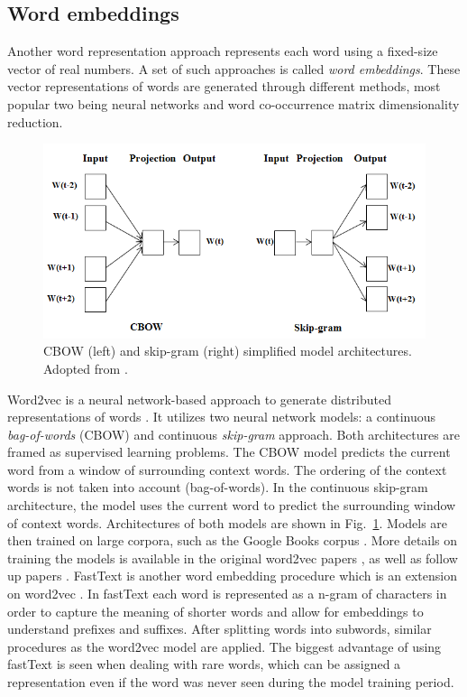 \subsection{Word embeddings}
\label{sec:embedding}

Another word representation approach represents each word using a fixed-size
vector of real numbers. A set of such approaches is called \textit{word
embeddings}. These vector representations of words are generated through
different methods, most popular two being neural networks and word co-occurrence
matrix dimensionality reduction.

\begin{figure}
	\includegraphics[scale=0.65]{skip_gram_cbow.png}
	\caption{CBOW (left) and skip-gram (right) simplified model architectures. Adopted from 
	\citep{suleiman2017deep}. }
	\label{fig:skip_gram_cbow}
\end{figure}

Word2vec is a neural network-based approach to generate distributed
representations of words \citep{mikolov2013distributed}.  It utilizes two
neural network models: a continuous \textit{bag-of-words} (CBOW) and continuous
\textit{skip-gram} approach.  Both architectures are framed as supervised learning problems.
The CBOW model predicts the current word from a window of
surrounding context words. 
The ordering of the context words is not taken into
account (bag-of-words). In the continuous skip-gram architecture, the model
uses the current word to predict the surrounding window of context words.
Architectures of both models are shown in Fig.~\ref{fig:skip_gram_cbow}. 
Models are then trained on large corpora, such as the Google Books corpus 
\citep{lin2012syntactic}. 
More details on training the models is available in the original word2vec papers
\citep{mikolov2013distributed, mikolov2013efficient}, as well as follow up papers
\citep{goldberg2014word2vec, rong2014word2vec}.
FastText is another word embedding procedure which is an extension on word2vec
\citep{bojanowski2017enriching}. In fastText each word is represented as a
n-gram of characters in order to capture the meaning of shorter words and allow
for embeddings to understand prefixes and suffixes. After splitting words into
subwords, similar procedures as the word2vec model are applied. 
The biggest advantage of using fastText is seen when dealing 
with rare words, which can be assigned a representation even if the word was
never seen during the model training period. 

